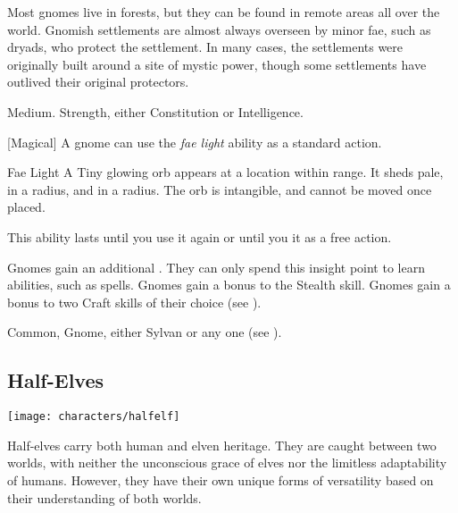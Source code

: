         Most gnomes live in forests, but they can be found in remote areas all over the world.
        Gnomish settlements are almost always overseen by minor fae, such as dryads, who protect the settlement.
        In many cases, the settlements were originally built around a site of mystic power, though some settlements have outlived their original protectors.

         Medium.
          Strength, either  Constitution or  Intelligence.
        \begin{raggeditemize}
            [Magical] A gnome can use the \textit{fae light} ability as a standard action.
                \begin{activeability}{Fae Light}
                    \rankline
                    A Tiny glowing orb appears at a location within \rngmed range.
                    It sheds pale,  in a \areasmall radius, and  in a \areamed radius.
                    The orb is intangible, and cannot be moved once placed.

                    This ability lasts until you use it again or until you  it as a free action.
                \end{activeability}
             Gnomes gain an additional .
                They can only spend this insight point to learn \magical abilities, such as spells.
             Gnomes gain a  bonus to the Stealth skill.
             Gnomes gain a  bonus to two Craft skills of their choice (see ).
        \end{raggeditemize}
         Common, Gnome, either Sylvan or any one  (see ).

    \subsection{Half-Elves}\label{Half-Elves}
        \texttt{[image: characters/halfelf]}

        Half-elves carry both human and elven heritage.
        They are caught between two worlds, with neither the unconscious grace of elves nor the limitless adaptability of humans.
        However, they have their own unique forms of versatility based on their understanding of both worlds.

